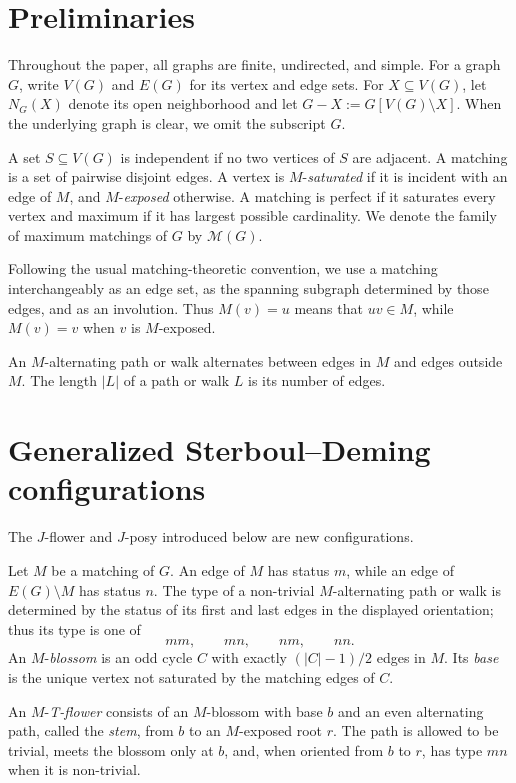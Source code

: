 \documentclass[preprint,12pt]{elsarticle}
\theoremstyle{plain}
\begin{document}
\section{Preliminaries}\label{sec_preliminaries}

Throughout the paper, all graphs are finite, undirected, and simple. For a
graph \(G\), write \(V(G)\) and \(E(G)\) for its vertex and edge sets. For
\(X\subseteq V(G)\), let \(N_G(X)\) denote its open neighborhood and let
\(G-X:=G[V(G)\setminus X]\). When the underlying graph is clear, we omit the
subscript \(G\).

A set \(S\subseteq V(G)\) is independent if no two vertices of \(S\) are
adjacent. A matching is a set of pairwise disjoint edges. A vertex is
\(M\)-\emph{saturated} if it is incident with an edge of \(M\), and
\(M\)-\emph{exposed} otherwise. A matching is perfect if it saturates every
vertex and maximum if it has largest possible cardinality. We denote the
family of maximum matchings of \(G\) by \(\mathcal M(G)\).

Following the usual matching-theoretic convention, we use a matching
interchangeably as an edge set, as the spanning subgraph determined by those
edges, and as an involution. Thus \(M(v)=u\) means that \(uv\in M\), while
\(M(v)=v\) when \(v\) is \(M\)-exposed.

An \(M\)-alternating path or walk alternates between edges in \(M\) and
edges outside \(M\). The length \(|L|\) of a path or walk \(L\) is its number
of edges.

\section{Generalized Sterboul--Deming configurations}
\label{sec_generalized_configurations}

The \(J\)-flower and \(J\)-posy introduced below are new configurations.

Let \(M\) be a matching of \(G\). An edge of \(M\) has status \(m\), while an
edge of \(E(G)\setminus M\) has status \(n\). The type of a non-trivial
\(M\)-alternating path or walk is determined by the status of its first and
last edges in the displayed orientation; thus its type is one of
\[
mm,\qquad mn,\qquad nm,\qquad nn.
\]
  An \(M\)-\emph{blossom} is an odd cycle
\(C\) with exactly \((|C|-1)/2\) edges in \(M\).  Its \emph{base} is the
unique vertex not saturated by the matching edges of \(C\).

An \(M\)-\emph{T-flower} consists of an \(M\)-blossom with base \(b\) and an even alternating path, called the \emph{stem}, from \(b\) to an \(M\)-exposed root \(r\).  The path is allowed to be trivial, meets the blossom only at \(b\), and, when oriented from \(b\) to \(r\), has type \(mn\) when it is non-trivial.
\end{document}
